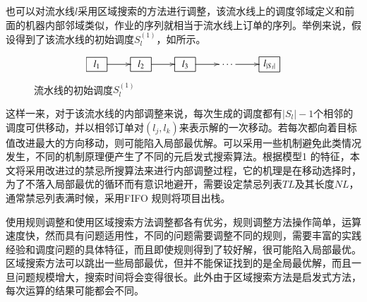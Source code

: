 \begin{asparaenum}
也可以对流水线$l$采用区域搜索的方法进行调整，该流水线上的调度邻域定义和前面的机器内部邻域类似，作业的序列就相当于流水线上订单的序列。举例来说，假设得到了该流水线的初始调度$S_l^{(1)}$，如所示。
\begin{figure}[h]
\begin{equation*}
\xymatrix{
\jobunit{l_1} \ar[r] & \jobunit{l_2} \ar[r]& \jobunit{l_3} \ar[r]&\cdots\ar[r] &\jobunit{l_{|S_l|}}
}
\end{equation*}
\caption{流水线的初始调度$S_l^{(1)}$\label{fig:initlschedule}}
\end{figure}
这样一来，对于该流水线的内部调整来说，每次生成的调度都有$|S_l|-1$个相邻的调度可供移动，并以相邻订单对$(l_j, l_k)$来表示解的一次移动。若每次都向着目标值改进最大的方向移动，则可能陷入局部最优解。可以采用一些机制避免此类情况发生，不同的机制原理便产生了不同的元启发式搜索算法。根据模型1 的特征，本文将采用改进过的禁忌所搜算法来进行内部调整过程，它的机理是在移动选择时，为了不落入局部最优的循环而有意识地避开，需要设定禁忌列表$TL$及其长度$NL$，通常禁忌列表满时候，采用FIFO 规则将项目出栈。

使用规则调整和使用区域搜索方法调整都各有优劣，规则调整方法操作简单，运算速度快，然而具有问题适用性，不同的问题需要调整不同的规则，需要丰富的实践经验和调度问题的具体特征，而且即使规则得到了较好解，很可能陷入局部最优。区域搜索方法可以跳出一些局部最优，但并不能保证找到的是全局最优解，而且一旦问题规模增大，搜索时间将会变得很长。此外由于区域搜索方法是启发式方法，每次运算的结果可能都会不同。


\end{asparaenum}

